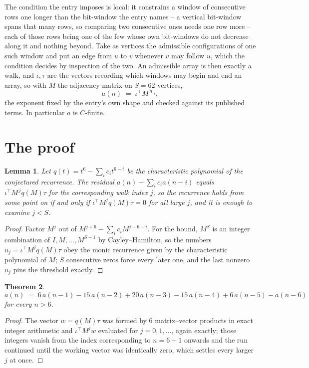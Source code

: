 \documentclass[11pt,a4paper]{article}
\theoremstyle{plain}
\newtheorem{theorem}{Theorem}
\newtheorem{lemma}[theorem]{Lemma}
\theoremstyle{definition}
\begin{document}
The condition the entry imposes is local: it constrains a window of consecutive rows one longer than the bit-window the entry names -- a vertical bit-window spans that many rows, so comparing two consecutive ones needs one row more -- each of those rows being one of the few whose own bit-windows do not decrease along it and nothing beyond. Take as vertices the admissible configurations of one such window and put an edge from $u$ to $v$ whenever $v$ may follow $u$, which the condition decides by inspection of the two.
An admissible array is then exactly a walk, and $\iota,\tau$ are the vectors recording which windows may begin and end an array, so with $M$ the adjacency matrix on $S=62$ vertices,
\[
a(n)\;=\;\iota^{\!\top}M^{\,n}\tau ,
\]
the exponent fixed by the entry's own shape and checked against its published terms. In
particular $a$ is $C$-finite.

\section{The proof}

\begin{lemma}\label{lem:crit}
Let $q(t)=t^{6}-\sum_i c_it^{6-i}$ be the characteristic polynomial of the
conjectured recurrence. The residual $a(n)-\sum_ic_ia(n-i)$ equals
$\iota^{\!\top}M^{\,j}q(M)\tau$ for the corresponding walk index $j$, so the recurrence
holds from some point on if and only if $\iota^{\!\top}M^{j}q(M)\tau=0$ for all large $j$,
and it is enough to examine $j<S$.
\end{lemma}

\begin{proof}
Factor $M^{j}$ out of $M^{j+6}-\sum_ic_iM^{j+6-i}$. For the bound, $M^{S}$
is an integer combination of $I,M,\dots,M^{S-1}$ by Cayley--Hamilton, so the numbers
$u_j=\iota^{\!\top}M^{j}q(M)\tau$ obey the monic recurrence given by the characteristic
polynomial of $M$; $S$ consecutive zeros force every later one, and the last nonzero $u_j$
pins the threshold exactly.
\end{proof}

\begin{theorem}
\[
a(n)\;=\;6\,a(n-1) - 15\,a(n-2) + 20\,a(n-3) - 15\,a(n-4) + 6\,a(n-5) - a(n-6)
\]
for every $n>6$.
\end{theorem}

\begin{proof}
The vector $w=q(M)\tau$ was formed by $6$ matrix--vector products in exact integer
arithmetic and $\iota^{\!\top}M^{j}w$ evaluated for $j=0,1,\dots$, again exactly; those
integers vanish from the index corresponding to $n=6+1$ onwards and the run continued
until the working vector was identically zero, which settles every larger $j$ at once.
\end{proof}
\end{document}
